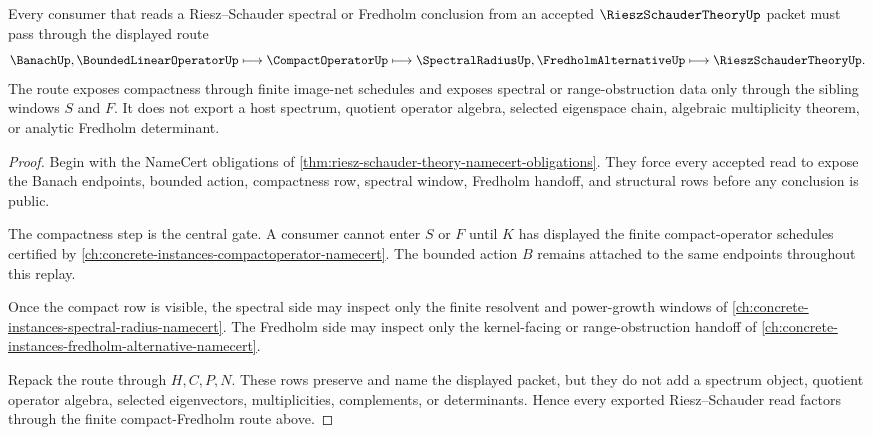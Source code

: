 \begin{theorem}
\label{thm:riesz-schauder-theory-compact-fredholm-route}
Every consumer that reads a Riesz--Schauder spectral or Fredholm conclusion from an accepted $\RieszSchauderTheoryUp$ packet must pass through the displayed route
$$
\BanachUp,\BoundedLinearOperatorUp
\longmapsto \CompactOperatorUp
\longmapsto \SpectralRadiusUp,\FredholmAlternativeUp
\longmapsto \RieszSchauderTheoryUp .
$$
The route exposes compactness through finite image-net schedules and exposes spectral or range-obstruction data only through the sibling windows $S$ and $F$. It does not export a host spectrum, quotient operator algebra, selected eigenspace chain, algebraic multiplicity theorem, or analytic Fredholm determinant.
\end{theorem}
\begin{proof}
Begin with the NameCert obligations of \autoref{thm:riesz-schauder-theory-namecert-obligations}. They force every accepted read to expose the Banach endpoints, bounded action, compactness row, spectral window, Fredholm handoff, and structural rows before any conclusion is public.

The compactness step is the central gate. A consumer cannot enter $S$ or $F$ until $K$ has displayed the finite compact-operator schedules certified by \autoref{ch:concrete-instances-compactoperator-namecert}. The bounded action $B$ remains attached to the same endpoints throughout this replay.

Once the compact row is visible, the spectral side may inspect only the finite resolvent and power-growth windows of \autoref{ch:concrete-instances-spectral-radius-namecert}. The Fredholm side may inspect only the kernel-facing or range-obstruction handoff of \autoref{ch:concrete-instances-fredholm-alternative-namecert}.

Repack the route through $H,C,P,N$. These rows preserve and name the displayed packet, but they do not add a spectrum object, quotient operator algebra, selected eigenvectors, multiplicities, complements, or determinants. Hence every exported Riesz--Schauder read factors through the finite compact-Fredholm route above.
\end{proof}


